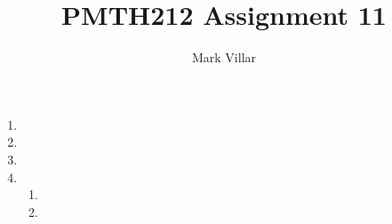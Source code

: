 \documentclass[12pt]{amsart}
\title{PMTH212 Assignment 11}
\author{Mark Villar}
\begin{document}
 

\maketitle 

\begin{enumerate}
	
	\item
		
	\item
		
	\item 
				
	\item 
		
		\begin{enumerate}
		
			\item
			
			\item
		
		\end{enumerate}
	
\end{enumerate}
\end{document}
